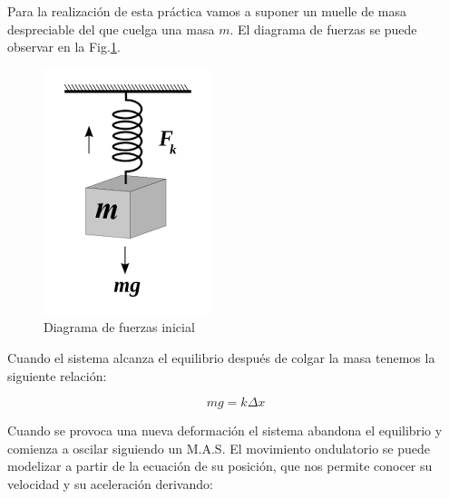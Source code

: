 \documentclass[a4paper,12pt,titlepage]{report}
\begin{document}
\par Para la realización de esta práctica vamos a suponer un muelle de masa despreciable del que cuelga una masa $m$. El diagrama de fuerzas se puede observar en la Fig.\ref{Diagrama fuerzas}.

\newpage

\begin{figure}
    \centering
    \includegraphics[width=0.75\linewidth]{Images/fuerzas hooke.png}
    \caption{Diagrama de fuerzas inicial}
    \label{Diagrama fuerzas}
\end{figure}

Cuando el sistema alcanza el equilibrio después de colgar la masa tenemos la siguiente relación:

\begin{equation}
    mg = k\Delta x
    \label{Met estatico}
\end{equation}

Cuando se provoca una nueva deformación el sistema abandona el equilibrio y comienza a oscilar siguiendo un M.A.S. El movimiento ondulatorio se puede modelizar a partir de la ecuación de su posición, que nos permite conocer su velocidad y su aceleración derivando:
\end{document}
